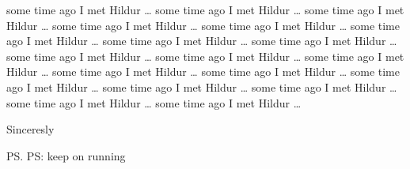 some time ago I met Hildur \ldots
some time ago I met Hildur \ldots
some time ago I met Hildur \ldots
some time ago I met Hildur \ldots
some time ago I met Hildur \ldots
some time ago I met Hildur \ldots
some time ago I met Hildur \ldots
some time ago I met Hildur \ldots
some time ago I met Hildur \ldots
some time ago I met Hildur \ldots
some time ago I met Hildur \ldots
some time ago I met Hildur \ldots
some time ago I met Hildur \ldots
some time ago I met Hildur \ldots
some time ago I met Hildur \ldots
some time ago I met Hildur \ldots
some time ago I met Hildur \ldots
some time ago I met Hildur \ldots

\closing{Sinceresly}

\ps PS: keep on running
